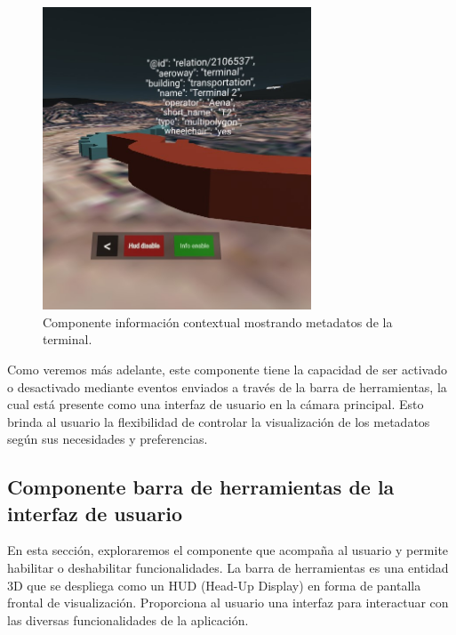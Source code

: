 \documentclass[a4paper, 11pt]{book}
\begin{document}
\begin{figure}[H]
  \centering
  \includegraphics[width=8cm, keepaspectratio]{img/tooltip.jpg}
  \caption{Componente información contextual mostrando metadatos de la terminal.}
  \label{fig:tooltip}
\end{figure}
Como veremos más adelante, este componente tiene la capacidad de ser activado o desactivado mediante eventos enviados a través de la barra de herramientas, la cual está presente como una interfaz de usuario en la cámara principal. Esto brinda al usuario la flexibilidad de controlar la visualización de los metadatos según sus necesidades y preferencias.

\subsection{Componente barra de herramientas de la interfaz de usuario}
\label{subsec:toolbar3d}
En esta sección, exploraremos el componente que acompaña al usuario y permite habilitar o deshabilitar funcionalidades. La barra de herramientas es una entidad 3D que se despliega como un HUD (Head-Up Display) en forma de pantalla frontal de visualización. Proporciona al usuario una interfaz para interactuar con las diversas funcionalidades de la aplicación.
\end{document}

